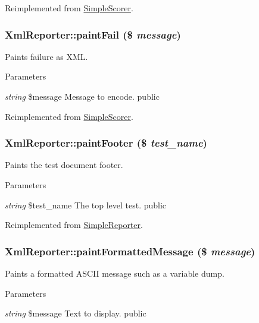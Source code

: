 Reimplemented from \hyperlink{class_simple_scorer_af85813652ea0ec8aca7261267c121f6c}{SimpleScorer}.\hypertarget{class_xml_reporter_afc04e91cbe663a1d38103392c9672b6f}{
\subsubsection[{paintFail}]{\setlength{\rightskip}{0pt plus 5cm}XmlReporter::paintFail (\$ {\em message})}}
\label{class_xml_reporter_afc04e91cbe663a1d38103392c9672b6f}
Paints failure as XML. 
\begin{DoxyParams}{Parameters}
\item[{\em string}]\$message Message to encode.  public \end{DoxyParams}


Reimplemented from \hyperlink{class_simple_scorer_a25656682bd645cf156f3a2a87893d8b3}{SimpleScorer}.\hypertarget{class_xml_reporter_a76c2686a0abdea6a07ce6437b708cc71}{
\subsubsection[{paintFooter}]{\setlength{\rightskip}{0pt plus 5cm}XmlReporter::paintFooter (\$ {\em test\_\-name})}}
\label{class_xml_reporter_a76c2686a0abdea6a07ce6437b708cc71}
Paints the test document footer. 
\begin{DoxyParams}{Parameters}
\item[{\em string}]\$test\_\-name The top level test.  public  \end{DoxyParams}


Reimplemented from \hyperlink{class_simple_reporter_a447a6e823a5c17b1bd5f922a0b18fded}{SimpleReporter}.\hypertarget{class_xml_reporter_ac6997a24df6320a76066b801b1f99154}{
\subsubsection[{paintFormattedMessage}]{\setlength{\rightskip}{0pt plus 5cm}XmlReporter::paintFormattedMessage (\$ {\em message})}}
\label{class_xml_reporter_ac6997a24df6320a76066b801b1f99154}
Paints a formatted ASCII message such as a variable dump. 
\begin{DoxyParams}{Parameters}
\item[{\em string}]\$message Text to display.  public \end{DoxyParams}


